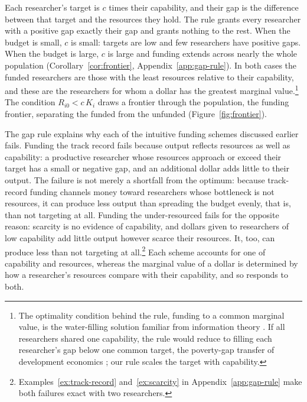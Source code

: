 \documentclass[article, 11pt, reqno]{amsart}
\theoremstyle{named}
\begin{document}
Each researcher's target is $c$ times their capability, and their gap is the difference between that target and the resources they hold. The rule grants every researcher with a positive gap exactly their gap and grants nothing to the rest. When the budget is small, $c$ is small: targets are low and few researchers have positive gaps. When the budget is large, $c$ is large and funding extends across nearly the whole population (Corollary~\ref{cor:frontier}, Appendix~\ref{app:gap-rule}). In both cases the funded researchers are those with the least resources relative to their capability, and these are the researchers for whom a dollar has the greatest marginal value.\footnote{The optimality condition behind the rule, funding to a common marginal value, is the water-filling solution familiar from information theory \citep{CoverThomas2006}. If all researchers shared one capability, the rule would reduce to filling each researcher's gap below one common target, the poverty-gap transfer of development economics \citep{FGT1984}; our rule scales the target with capability.} The condition $R_{i0} < c\,K_i$ draws a frontier through the population, the funding frontier, separating the funded from the unfunded (Figure~\ref{fig:frontier}).



The gap rule explains why each of the intuitive funding schemes discussed earlier fails. Funding the track record fails because output reflects resources as well as capability: a productive researcher whose resources approach or exceed their target has a small or negative gap, and an additional dollar adds little to their output. The failure is not merely a shortfall from the optimum: because track-record funding channels money toward researchers whose bottleneck is not resources, it can produce less output than spreading the budget evenly, that is, than not targeting at all. Funding the under-resourced fails for the opposite reason: scarcity is no evidence of capability, and dollars given to researchers of low capability add little output however scarce their resources. It, too, can produce less than not targeting at all.\footnote{Examples~\ref{ex:track-record} and~\ref{ex:scarcity} in Appendix~\ref{app:gap-rule} make both failures exact with two researchers.} Each scheme accounts for one of capability and resources, whereas the marginal value of a dollar is determined by how a researcher's resources compare with their capability, and so responds to both.
\end{document}
